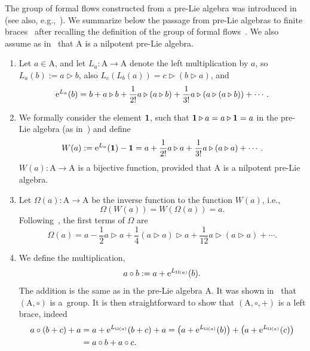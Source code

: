 \documentclass[10pt,a4paper]{amsart}
\numberwithin{equation}{section}
\theoremstyle{definition}
\begin{document}
The group of formal flows constructed from a pre-Lie algebra was introduced in~\cite{Chrono} (see also, e.g.,~\cite{Manchon}).
We summarize below the passage from pre-Lie algebras {to finite braces}~\cite{Rump, Smok1, Smok2} after recalling the definition of the
group of formal flows~\cite{Chrono, Manchon}. We also assume as in~\cite{Smok1, Smok2} that ${\mathrm A}$ is a nilpotent pre-Lie algebra.
\begin{enumerate}\itemsep=0pt
\item Let $a\in {\mathrm A}$, and let $L_{a}\colon {\mathrm A}\rightarrow{\mathrm A}$ denote the left multiplication by $a$, so
$L_{a}(b):=a\triangleright b$, also $L_{c}(L_{b}(a))=c\triangleright (b\triangleright a)$,
 and
 \[
 {\rm e}^{L_{a}}(b) =b+a\triangleright b+{\frac 1{2!}}a\triangleright (a\triangleright b)+{\frac 1{3!}}a\triangleright (a\triangleright (a\triangleright b))+\cdots .
 \]

\item We formally consider the element ${\bf 1}$, such that ${\bf 1}\triangleright a=a\triangleright {\bf 1}=a$ in the pre-Lie algebra (as in~\cite{Manchon}) and
define
\[
W(a):={\rm e}^{L_{a}}({\bf 1})-{\bf 1}=a+{\frac 1{2!}}a\triangleright a+{\frac 1{3!}}a\triangleright (a\triangleright a)+ \cdots .
\]
 $W(a)\colon {\mathrm A}\rightarrow {\mathrm A}$ is a bijective function, provided that ${\mathrm A}$ is a nilpotent pre-Lie algebra.

\item Let $\Omega (a)\colon {\mathrm A}\rightarrow {\mathrm A}$ be the inverse function to the function $W(a)$, i.e.,
\[
\Omega (W(a))=W(\Omega (a))=a.
\]
Following~\cite{Manchon}, the first terms of $\Omega $ are
\[
\Omega(a)= a-{\frac 12}a\triangleright a +{\frac 14} (a\triangleright a)\triangleright a +{\frac {1}{12}}a\triangleright(a\triangleright a) +\cdots .
\]

\item We define the multiplication, \[a\circ b:=a+{\rm e}^{L_{\Omega (a)}}(b).\]
The addition is the same as in the pre-Lie algebra ${\mathrm A}$.
It was shown in~\cite{Chrono} that $({\mathrm A}, \circ )$ is a~group. It is then straightforward to show that $({\mathrm A}, \circ , + )$ is a left brace, indeed
 \begin{align*}
 a\circ (b+c)+a&=a+{\rm e}^{L_{\Omega (a)}}(b+c)+a=\bigl(a+{\rm e}^{L_{\Omega (a)}}(b)\bigr)+\bigl(a+{\rm e}^{L_{\Omega (a)}}(c)\bigr)\\
 &=a\circ b+a\circ c.
 \end{align*}
\end{enumerate}
\end{document}
